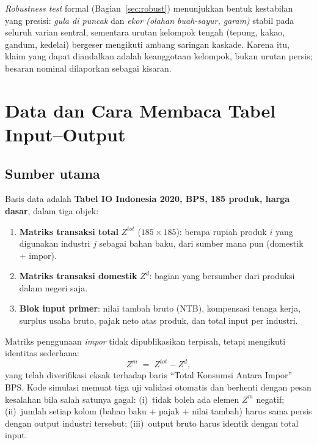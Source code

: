 \documentclass[11pt,a4paper]{article}
\newcommand{\en}[1]{\textit{#1}}   %
\begin{document}
\en{Robustness test} formal (Bagian~\ref{sec:robust}) menunjukkan bentuk
kestabilan yang presisi: \emph{gula di puncak} dan \emph{ekor (olahan
buah-sayur, garam)} stabil pada seluruh varian sentral, sementara urutan
kelompok tengah (tepung, kakao, gandum, kedelai) bergeser mengikuti
ambang saringan kaskade. Karena itu, klaim yang dapat diandalkan adalah
keanggotaan kelompok, bukan urutan persis; besaran nominal dilaporkan
sebagai kisaran.

\section{Data dan Cara Membaca Tabel Input--Output}

\subsection{Sumber utama}

Basis data adalah \textbf{Tabel IO Indonesia 2020, BPS, 185 produk, harga
dasar}, dalam tiga objek:
\begin{enumerate}[nosep]
  \item \textbf{Matriks transaksi total} $Z^{tot}$ ($185 \times 185$):
        berapa rupiah produk $i$ yang digunakan industri $j$ sebagai bahan
        baku, dari sumber mana pun (domestik + impor).
  \item \textbf{Matriks transaksi domestik} $Z^{d}$: bagian yang bersumber
        dari produksi dalam negeri saja.
  \item \textbf{Blok input primer}: nilai tambah bruto (NTB), kompensasi
        tenaga kerja, surplus usaha bruto, pajak neto atas produk, dan
        total input per industri.
\end{enumerate}
Matriks penggunaan \emph{impor} tidak dipublikasikan terpisah, tetapi
mengikuti identitas sederhana:
\begin{equation}
Z^{m} \;=\; Z^{tot} - Z^{d},
\label{eq:zm}
\end{equation}
yang telah diverifikasi eksak terhadap baris ``Total Konsumsi Antara
Impor'' BPS. Kode simulasi memuat tiga uji validasi otomatis dan berhenti
dengan pesan kesalahan bila salah satunya gagal: (i)~tidak boleh ada elemen
$Z^m$ negatif; (ii)~jumlah setiap kolom (bahan baku + pajak + nilai tambah)
harus sama persis dengan output industri tersebut; (iii)~output bruto harus
identik dengan total input.
\end{document}
